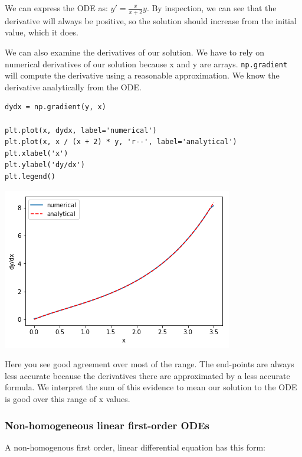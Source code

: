 \documentclass[11pt]{article}
\begin{document}
We can express the ODE as: \(y' = \frac{x}{x+2}y\). By inspection, we can see that the derivative will always be positive, so the solution should increase from the initial value, which it does.

We can also examine the derivatives of our solution. We have to rely on numerical derivatives of our solution because x and y are arrays. \texttt{np.gradient} will compute the derivative using a reasonable approximation. We know the derivative analytically from the ODE.

\begin{verbatim}
dydx = np.gradient(y, x)

plt.plot(x, dydx, label='numerical')
plt.plot(x, x / (x + 2) * y, 'r--', label='analytical')
plt.xlabel('x')
plt.ylabel('dy/dx')
plt.legend()
\end{verbatim}

\begin{center}
\includegraphics[width=.9\linewidth]{obipy-resources/744bcb3e58866fd0750c7a1efd9d42e8-683113tP.png}
\end{center}

Here you see good agreement over most of the range. The end-points are always less accurate because the derivatives there are approximated by a less accurate formula. We interpret the sum of this evidence to mean our solution to the ODE is good over this range of x values.

\subsubsection{Non-homogeneous linear first-order ODEs}
\label{sec:org3691c6a}

A non-homogenous first order, linear differential equation has this form:
\end{document}
